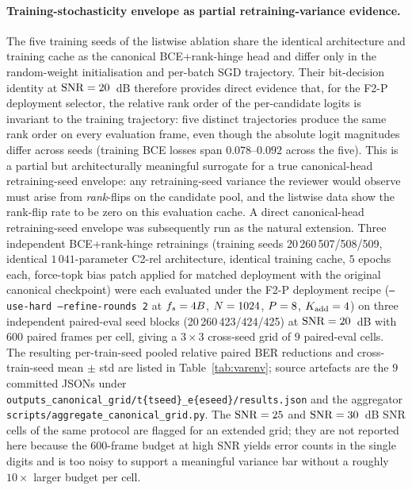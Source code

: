 \paragraph{Training-stochasticity envelope as partial retraining-variance evidence.} The five training seeds of the listwise ablation share the identical architecture and training cache as the canonical BCE+rank-hinge head and differ only in the random-weight initialisation and per-batch SGD trajectory. Their bit-decision identity at $\mathrm{SNR} = 20$~dB therefore provides direct evidence that, for the F2-P deployment selector, the relative rank order of the per-candidate logits is invariant to the training trajectory: five distinct trajectories produce the same rank order on every evaluation frame, even though the absolute logit magnitudes differ across seeds (training BCE losses span $0.078$--$0.092$ across the five). This is a partial but architecturally meaningful surrogate for a true canonical-head retraining-seed envelope: any retraining-seed variance the reviewer would observe must arise from \emph{rank}-flips on the candidate pool, and the listwise data show the rank-flip rate to be zero on this evaluation cache. A direct canonical-head retraining-seed envelope was subsequently run as the natural extension. Three independent BCE+rank-hinge retrainings (training seeds 20\,260\,507/508/509, identical $1\,041$-parameter C2-rel architecture, identical training cache, $5$ epochs each, force-topk bias patch applied for matched deployment with the original canonical checkpoint) were each evaluated under the F2-P deployment recipe (\texttt{--use-hard --refine-rounds 2} at $f_s = 4B$, $N = 1024$, $P = 8$, $K_{\mathrm{add}} = 4$) on three independent paired-eval seed blocks (20\,260\,423/424/425) at $\mathrm{SNR} = 20$~dB with $600$ paired frames per cell, giving a $3 \times 3$ cross-seed grid of $9$ paired-eval cells. The resulting per-train-seed pooled relative paired BER reductions and cross-train-seed mean $\pm$ std are listed in Table~\ref{tab:varenv}; source artefacts are the $9$ committed JSONs under \texttt{outputs\_canonical\_grid/t\{tseed\}\_e\{eseed\}/results.json} and the aggregator \texttt{scripts/aggregate\_canonical\_grid.py}. The $\mathrm{SNR} = 25$ and $\mathrm{SNR} = 30$~dB SNR cells of the same protocol are flagged for an extended grid; they are not reported here because the $600$-frame budget at high SNR yields error counts in the single digits and is too noisy to support a meaningful variance bar without a roughly $10\times$ larger budget per cell.


